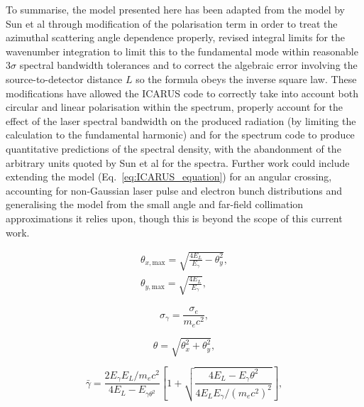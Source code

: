 \documentclass[../main.tex]{subfiles}
\begin{document}
To summarise, the model presented here has been adapted from the model by Sun et al \cite{} through modification of the polarisation term in order to treat the azimuthal scattering angle dependence properly, revised integral limits for the wavenumber integration to limit this to the fundamental mode within reasonable $3\sigma$ spectral bandwidth tolerances and to correct the algebraic error involving the source-to-detector distance $L$ so the formula obeys the inverse square law. These modifications have allowed the \textsc{ICARUS} code to correctly take into account both circular and linear polarisation within the spectrum, properly account for the effect of the laser spectral bandwidth on the produced radiation (by limiting the calculation to the fundamental harmonic) and for the spectrum code to produce quantitative predictions of the spectral density, with the abandonment of the arbitrary units quoted by Sun et al \cite{sun2009characterizations,sun2011theoretical} for the spectra. Further work could include extending the model (Eq.~\ref{eq:ICARUS_equation}) for an angular crossing, accounting for non-Gaussian laser pulse and electron bunch distributions and generalising the model from the small angle and far-field collimation approximations it relies upon, though this is beyond the scope of this current work.        






\begin{gather}
\theta_{x,\mathrm{max}} = \sqrt{\frac{4E_{L}}{E_{\gamma}}-\theta_{y}^{2}}, \\
\theta_{y,\mathrm{max}} = \sqrt{\frac{4E_{L}}{E_{\gamma}}},
\label{eq:theta_max_parameter_sun}
\end{gather}

\begin{equation}
\sigma_{\gamma} = \frac{\sigma_{e}}{m_{e}c^{2}},
\label{eq:gamma_energy_spread}
\end{equation}

\begin{equation}
\theta = \sqrt{\theta_{x}^{2}+\theta_{y}^{2}},
\label{eq:theta_angle_sun}
\end{equation}

\begin{equation}
\bar{\gamma} = \frac{2E_{\gamma}E_{L}/m_{e}c^{2}}{4E_{L}-E_{\gamma\theta^{2}}}\left[1+\sqrt{\frac{4E_{L}-E_{\gamma}\theta^{2}}{4E_{L}E_{\gamma}/\left(m_{e}c^{2}\right)^{2}}}\right],  
\label{eq:gamma_bar_sun}
\end{equation}
\end{document}
